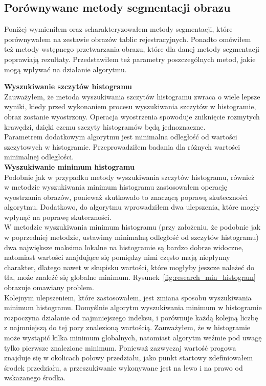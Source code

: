 \subsection{Porównywane metody segmentacji obrazu}
Poniżej wymieniłem oraz scharakteryzowałem metody segmentacji, które porównywałem na zestawie obrazów tablic rejestracyjnych. Ponadto omówiłem też metody wstępnego przetwarzania obrazu, które dla danej metody segmentacji poprawiają rezultaty. Przedstawiłem też parametry poszczególnych metod, jakie mogą wpływać na działanie algorytmu.

\textbf{Wyszukiwanie szczytów histogramu}\\
Zauważyłem, że metoda wyszukiwania szczytów histogramu zwraca o wiele lepsze wyniki, kiedy przed wykonaniem procesu wyszukiwania szczytów w histogramie, obraz zostanie wyostrzony. Operacja wyostrzenia spowoduje zniknięcie rozmytych krawędzi, dzięki czemu szczyty histogramów będą jednoznaczne. \\
Parametrem dodatkowym algorytmu jest minimalna odległość od wartości szczytowych w histogramie. Przeprowadziłem badania dla różnych wartości minimalnej odległości.\\

\textbf{Wyszukiwanie minimum histogramu}\\
Podobnie jak w przypadku metody wyszukiwania szczytów histogramu, również w metodzie wyszukiwania minimum histogramu zastosowałem operację wyostrzania obrazów, ponieważ skutkowało to znaczącą poprawą skuteczności algorytmu. Dodatkowo, do algorytmu wprowadziłem dwa ulepszenia, które mogły wpłynąć na poprawę skuteczności.\\
W metodzie wyszukiwania minimum histogramu (przy założeniu, że podobnie jak w poprzedniej metodzie, ustawimy minimalną odległość od szczytów histogramu) dwa największe maksima lokalne na histogramie są bardzo dobrze widoczne, natomiast wartości znajdujące się pomiędzy nimi często mają niepłynny charakter, dlatego nawet w skupisku wartości, które mogłyby jeszcze należeć do tła, może znaleźć się globalne minimum. Rysunek~\ref{fig:research_min_histogram} obrazuje omawiany problem. \\
Kolejnym ulepszeniem, które zastosowałem, jest zmiana sposobu wyszukiwania minimum histogramu. Domyślnie algorytm wyszukiwania minimum w histogramie rozpoczyna działanie od najmniejszego indeksu, i porównuje każdą kolejną liczbę z najmniejszą do tej pory znalezioną wartością. Zauważyłem, że w histogramie może wystąpić kilka minimum globalnych, natomiast algorytm weźmie pod uwagę tylko pierwsze znalezione minimum. Ponieważ zazwyczaj wartość progowa znajduje się w okolicach połowy przedziału, jako punkt startowy zdefiniowałem środek przedziału, a przeszukiwanie wykonywane jest na lewo i na prawo od wskazanego środka.

